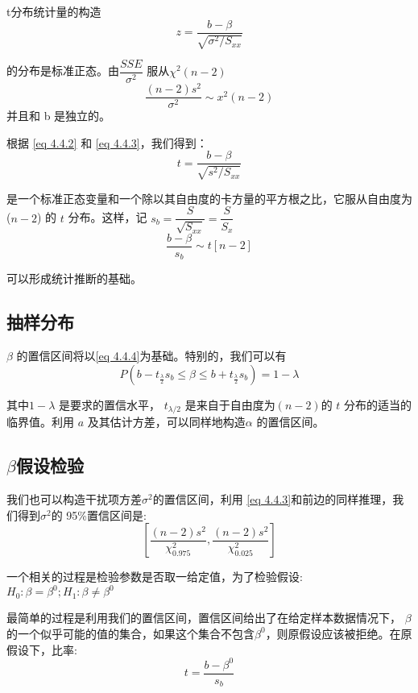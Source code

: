 {\heiti t分布统计量的构造}
\begin{equation}
    z=\frac{b-\beta}{\sqrt{\sigma^{2} / S_{x x}}}
    \label{eq 4.4.2}
\end{equation}

的分布是标准正态。由$ \dfrac{SSE}{\sigma^2}$ 服从$ \chi^{2} (n − 2) $ 
\begin{equation}
    \frac{(n-2) s^{2}}{\sigma^{2}} \sim x^{2}(n-2)
    \label{eq 4.4.3}
\end{equation}
并且和 b 是独立的。

根据 \ref{eq 4.4.2} 和 \ref{eq 4.4.3}，我们得到：
$$ t=\frac{b-\beta}{\sqrt{s^{2} / S_{x x}}} $$

是一个标准正态变量和一个除以其自由度的卡方量的平方根之比，它服从自由度为 ($ n - 2 $)  的 $ t $  分布。这样，记 $s_{b}=\dfrac{S}{\sqrt{S_{x x}}}=\dfrac{S}{S_{x}}$
\begin{equation}
    \frac{b-\beta}{s_{b}} \sim t[n-2]
    \label{eq 4.4.4}
\end{equation}

可以形成统计推断的基础。

\subsection{抽样分布}
$ \beta $ 的置信区间将以\ref{eq 4.4.4}为基础。特别的，我们可以有
$$P\left(b-t_{\frac{\lambda}{2} } s_{b} \leqslant \beta \leqslant b+t_{\frac{\lambda}{2}} s_{b}\right)=1-\lambda$$

其中$ 1− \lambda $ 是要求的置信水平， $ t_{\lambda / 2} $ 是来自于自由度为$ (n - 2) $的 $ t $ 分布的适当的临界值。利用 $ a $ 及其估计方差，可以同样地构造$ \alpha $ 的置信区间。

\subsection{ \texorpdfstring{$\beta$} 的假设检验}
我们也可以构造干扰项方差$\sigma^{2} $的置信区间，利用 \ref{eq 4.4.3}和前边的同样推理，我们得到$ \sigma^{2} $的 95\%置信区间是:
$$\left [ \dfrac{(n-2) s^{2}}{\chi_{0.975}^{2}} , \dfrac{(n-2) s^{2}}{\chi_{0.025}^{2}} \right  ] $$

一个相关的过程是检验参数是否取一给定值，为了检验假设:
$ H_{0}: \beta = \beta^{0} ; H_{1}: \beta \neq \beta^{0}$

最简单的过程是利用我们的置信区间，置信区间给出了在给定样本数据情况下， $ \beta $ 的一个似乎可能的值的集合，如果这个集合不包含$ \beta^{0} $，则原假设应该被拒绝。在原假设下，比率:
$$ t=\frac{b-\beta^{0}}{s_{b}} $$

